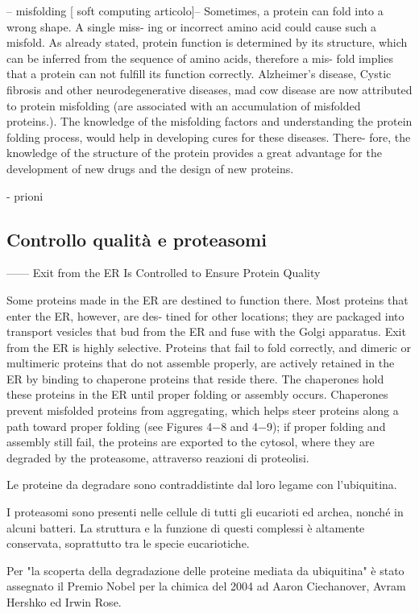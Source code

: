 -- misfolding [ soft computing articolo]--
Sometimes, a protein can fold into a wrong shape. A single miss-
ing or incorrect amino acid could cause such a misfold. As already
stated, protein function is determined by its structure, which can
be inferred from the sequence of amino acids, therefore a mis-
fold implies that a protein can not fulfill its function correctly.
Alzheimer’s disease, Cystic fibrosis and other neurodegenerative
diseases, mad cow disease are now attributed to protein misfolding (are associated with an accumulation
of misfolded proteins.). The knowledge
of the misfolding factors and understanding the protein folding
process, would help in developing cures for these diseases. There-
fore, the knowledge of the structure of the protein provides a great
advantage for the development of new drugs and the design of new
proteins.

- prioni

\subsection{Controllo qualità e proteasomi}
------
Exit from the ER Is Controlled to Ensure Protein Quality

 Some proteins made in the ER are destined to function there.
 Most proteins that enter the ER, however, are des-
tined for other locations; they are packaged into transport vesicles that
bud from the ER and fuse with the Golgi apparatus.
Exit from the ER is highly selective. 
Proteins that fail to fold correctly, and
dimeric or multimeric proteins that do not assemble properly, are actively
retained in the ER by binding to chaperone proteins that reside there. The
chaperones hold these proteins in the ER until proper folding or assembly
occurs. Chaperones prevent misfolded proteins from aggregating, which
helps steer proteins along a path toward proper folding (see Figures 4−8
and 4−9); if proper folding and assembly still fail, the proteins are exported
to the cytosol, where they are degraded by the proteasome, attraverso reazioni di proteolisi.

Le proteine da degradare sono contraddistinte dal loro legame con l'ubiquitina.

I proteasomi sono presenti nelle cellule di tutti gli eucarioti ed archea, nonché in alcuni batteri. La struttura e la funzione di questi complessi è altamente conservata, soprattutto tra le specie eucariotiche.

Per "la scoperta della degradazione delle proteine mediata da ubiquitina" è stato assegnato il Premio Nobel per la chimica del 2004 ad Aaron Ciechanover, Avram Hershko ed Irwin Rose.


